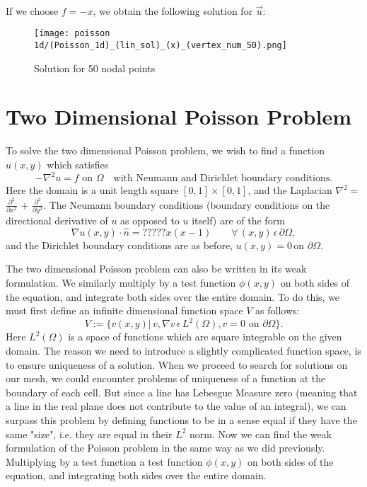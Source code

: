 \documentclass{article}
\begin{document}
\\
\\
\\
If we choose $f = -x$, we obtain the following solution for $\vec{u}$:
\begin{figure}[hbt!]
    \centering
    \texttt{[image: poisson 1d/(Poisson\_1d)\_(lin\_sol)\_(x)\_(vertex\_num\_50).png]}
    \caption{Solution for 50 nodal points}
    \label{fig:linear basis sum}
\end{figure}

\section{Two Dimensional Poisson Problem}
To solve the two dimensional Poisson problem, we wish to find a function $u(x,y)$ which satisfies 
\[-\nabla^{2}u = f\,\,\textrm{on }\Omega \quad \textrm{with Neumann and Dirichlet boundary conditions}.\]
Here the domain is a unit length square $[0,1]\times[0,1]$, and the Laplacian $\nabla^{2} =$ {\large$\frac{\partial^2}{\partial x^2}$} $+$ {\large$\frac{\partial^2}{\partial y^2}$}. The Neumann boundary conditions (boundary conditions on the directional derivative of $u$ as opposed to $u$ itself) are of the form $$\nabla u(x,y)\cdot \hat{n} = ?????x(x-1) \qquad \forall\, (x,y)\, \epsilon \,\partial\Omega,$$
and the Dirichlet boundary conditions are as before, $u(x,y) = 0 \, \textrm{on } \partial\Omega.$

The two dimensional Poisson problem can also be written in its weak formulation. We similarly multiply by a test function $\phi(x,y)$ on both sides of the equation, and integrate both sides over the entire domain. To do this, we must first define an infinite dimensional function space $V$ as follows:
$$V := \{v(x,y)| \,v, \nabla v \,\epsilon\, L^2(\Omega),  v = 0 \,\, \textrm{on } \partial\Omega\}.$$
Here $L^2(\Omega)$ is a space of functions which are square integrable on the given domain. The reason we need to introduce a slightly complicated function space, is to ensure uniqueness of a solution. When we proceed to search for solutions on our mesh, we could encounter problems of uniqueness of a function at the boundary of each cell. But since a line has Lebesgue Measure zero (meaning that a line in the real plane does not contribute to the value of an integral), we can surpass this problem by defining functions to be in a sense equal if they have the same "size", i.e. they are equal in their $L^2$ norm. 
Now we can find the weak formulation of the Poisson problem in the same way as we did previously. Multiplying by a test function a test function $\phi(x,y)$ on both sides of the equation, and integrating both sides over the entire domain.
\end{document}
